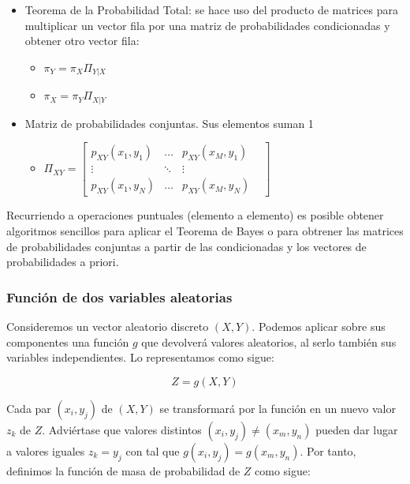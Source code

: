 \documentclass[11pt]{article}
\providecommand{\tightlist}{%
      \setlength{\itemsep}{0pt}\setlength{\parskip}{0pt}}
\begin{document}
    \begin{itemize}
\tightlist
\item
  Teorema de la Probabilidad Total: se hace uso del producto de matrices
  para multiplicar un vector fila por una matriz de probabilidades
  condicionadas y obtener otro vector fila:

  \begin{itemize}
  \tightlist
  \item
    \(\pi_Y = \pi_X\Pi_{Y | X}\)
  \item
    \(\pi_X = \pi_Y\Pi_{X | Y}\)
  \end{itemize}
\item
  Matriz de probabilidades conjuntas. Sus elementos suman 1

  \begin{itemize}
  \tightlist
  \item
    \( \Pi_{XY} = \begin{bmatrix}
  p_{XY}(x_1,y_1) & \ldots & p_{XY}(x_M,y_1)\\
  \vdots & \ddots & \vdots\\
  p_{XY}(x_1,y_N) & \ldots & p_{XY}(x_M,y_N) & 
 \end{bmatrix}\)
  \end{itemize}
\end{itemize}

Recurriendo a operaciones puntuales (elemento a elemento) es posible
obtener algoritmos sencillos para aplicar el Teorema de Bayes o para
obtrener las matrices de probabilidades conjuntas a partir de las
condicionadas y los vectores de probabilidades a priori.

    \hypertarget{funciuxf3n-de-dos-variables-aleatorias}{%
\subsubsection{Función de dos variables
aleatorias}\label{funciuxf3n-de-dos-variables-aleatorias}}

Consideremos un vector aleatorio discreto \((X,Y)\). Podemos aplicar
sobre sus componentes una función \(g\) que devolverá valores
aleatorios, al serlo también sus variables independientes. Lo
representamos como sigue:

\[Z = g(X,Y)\]

Cada par \((x_i, y_j)\) de \((X, Y)\) se transformará por la función en
un nuevo valor \(z_k\) de \(Z\). Adviértase que valores distintos
\((x_i,y_j) \neq (x_m, y_n)\) pueden dar lugar a valores iguales
\(z_k = y_j\) con tal que \(g(x_i,y_j)=g(x_m,y_n)\). Por tanto,
definimos la función de masa de probabilidad de \(Z\) como sigue:
\end{document}
